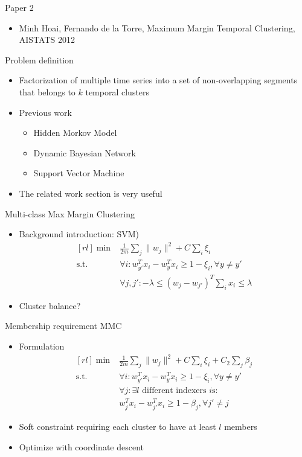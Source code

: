 \documentclass[12pt]{beamer}
\begin{document}
\begin{frame}{Paper 2}
	\begin{itemize}
		\item Minh Hoai, Fernando de la Torre, Maximum Margin Temporal Clustering, AISTATS 2012
	\end{itemize}
\end{frame}

\begin{frame}{Problem definition}
	\begin{itemize}
		\item Factorization of multiple time series into a set of non-overlapping segments that belongs to $k$ temporal clusters
		\item Previous work
		\begin{itemize}
			\item Hidden Morkov Model
			\item Dynamic Bayesian Network
			\item Support Vector Machine
		\end{itemize}
		\item The related work section is very useful
	\end{itemize}
\end{frame}

\begin{frame}{Multi-class Max Margin Clustering}
	\begin{itemize}
		\item Background introduction: SVM)
		\[ \begin{aligned}[rl] \min & \frac{1}{2m} \sum_j \lVert w_j \rVert^2 + C\sum_i \xi_i \\ \text{s.t. } & \forall i: w_{y'}^Tx_i - w_y^Tx_i \geq 1 - \xi_i, \forall y \neq y' \\ & \forall j, j': -\lambda \leq (w_j - w_{j'})^T\sum_i x_i \leq \lambda \end{aligned} \]
		\item Cluster balance?
	\end{itemize}
\end{frame}

\begin{frame}{Membership requirement MMC}
	\begin{itemize}
		\item Formulation
        \[ \begin{aligned}[rl] \min & \frac{1}{2m} \sum_j \lVert w_j \rVert^2 + C\sum_i \xi_i + C_2\sum_j \beta_j \\ \text{s.t. } & \forall i: w_{y'}^Tx_i - w_y^Tx_i \geq 1 - \xi_i, \forall y \neq y' \\ & \forall j: \exists l \text{ different indexers }i\text{s}: \\ & w_j^Tx_i-w_{j'}^Tx_i\geq1-\beta_j, \forall j' \neq j \end{aligned} \]
		\item Soft constraint requiring each cluster to have at least $l$ members
		\item Optimize with coordinate descent
	\end{itemize}
\end{frame}
\end{document}
